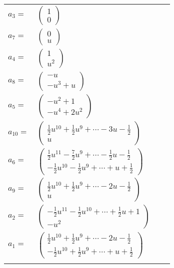 \documentclass[1p]{elsarticle_modified}
\theoremstyle{definition}
\begin{document}
\begin{tabular}{m{7pt} m{180pt} m{7pt} m{180pt} }
\flushright $a_{3}=$&$\begin{pmatrix}1\\0\end{pmatrix}$ \\
\flushright $a_{7}=$&$\begin{pmatrix}0\\u\end{pmatrix}$ \\
\flushright $a_{4}=$&$\begin{pmatrix}1\\u^2\end{pmatrix}$ \\
\flushright $a_{8}=$&$\begin{pmatrix}- u\\- u^3+u\end{pmatrix}$ \\
\flushright $a_{5}=$&$\begin{pmatrix}- u^2+1\\- u^4+2 u^2\end{pmatrix}$ \\
\flushright $a_{10}=$&$\begin{pmatrix}\frac{1}{2} u^{10}+\frac{1}{2} u^9+\cdots-3 u-\frac{1}{2}\\u\end{pmatrix}$ \\
\flushright $a_{6}=$&$\begin{pmatrix}\frac{1}{2} u^{11}-\frac{7}{2} u^9+\cdots-\frac{1}{2} u-\frac{1}{2}\\-\frac{1}{2} u^{10}-\frac{1}{2} u^9+\cdots+u+\frac{1}{2}\end{pmatrix}$ \\
\flushright $a_{9}=$&$\begin{pmatrix}\frac{1}{2} u^{10}+\frac{1}{2} u^9+\cdots-2 u-\frac{1}{2}\\u\end{pmatrix}$ \\
\flushright $a_{2}=$&$\begin{pmatrix}-\frac{1}{2} u^{11}-\frac{1}{2} u^{10}+\cdots+\frac{1}{2} u+1\\- u^2\end{pmatrix}$ \\
\flushright $a_{1}=$&$\begin{pmatrix}\frac{1}{2} u^{10}+\frac{1}{2} u^9+\cdots-2 u-\frac{1}{2}\\-\frac{1}{2} u^{10}+\frac{1}{2} u^9+\cdots+u+\frac{1}{2}\end{pmatrix}$\\&\end{tabular}
\end{document}
